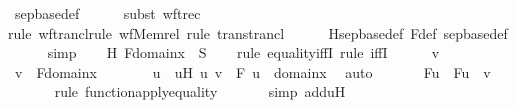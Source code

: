 \begin{isabellebody}
\ sep{\isacharunderscore}{\kern0pt}base{\isacharunderscore}{\kern0pt}def\ \isanewline
\ \ \ \ \isamarkupfalse%
{\isacharparenleft}{\kern0pt}subst\ wftrec{\isacharparenright}{\kern0pt}\isanewline
\ \ \ \ \ \ \isamarkupfalse%
{\isacharparenleft}{\kern0pt}rule\ wf{\isacharunderscore}{\kern0pt}trancl{\isacharcomma}{\kern0pt}rule\ wf{\isacharunderscore}{\kern0pt}Memrel{\isacharcomma}{\kern0pt}\ rule\ trans{\isacharunderscore}{\kern0pt}trancl{\isacharparenright}{\kern0pt}\isanewline
\ \ \ \ \isamarkupfalse%
\ Hsep{\isacharunderscore}{\kern0pt}base{\isacharunderscore}{\kern0pt}def\ F{\isacharunderscore}{\kern0pt}def\ sep{\isacharunderscore}{\kern0pt}base{\isacharunderscore}{\kern0pt}def\isanewline
\ \ \ \ \isamarkupfalse%
\ simp\isanewline
\isanewline
\ \ \isamarkupfalse%
\ H{}{\isacharcolon}{\kern0pt}\ {\isachardoublequoteopen}F{\isacharbackquote}{\kern0pt}{\isacharbackquote}{\kern0pt}domain{\isacharparenleft}{\kern0pt}x{\isacharparenright}{\kern0pt}\ {\isacharequal}{\kern0pt}\ S{\isachardoublequoteclose}\ \isanewline
\ \ \isamarkupfalse%
{\isacharparenleft}{\kern0pt}rule\ equality{\isacharunderscore}{\kern0pt}iffI{\isacharcomma}{\kern0pt}\ rule\ iffI{\isacharparenright}{\kern0pt}\isanewline
\ \ \ \ \isamarkupfalse%
\ v\ \isamarkupfalse%
\ {\isachardoublequoteopen}v\ {\isasymin}\ F{\isacharbackquote}{\kern0pt}{\isacharbackquote}{\kern0pt}domain{\isacharparenleft}{\kern0pt}x{\isacharparenright}{\kern0pt}{\isachardoublequoteclose}\isanewline
\ \ \ \ \isamarkupfalse%
\ \isamarkupfalse%
\ u\ \ uH{\isacharcolon}{\kern0pt}\ {\isachardoublequoteopen}{\isacharless}{\kern0pt}u{\isacharcomma}{\kern0pt}\ v{\isachargreater}{\kern0pt}\ {\isasymin}\ F{\isachardoublequoteclose}\ {\isachardoublequoteopen}u\ {\isasymin}\ domain{\isacharparenleft}{\kern0pt}x{\isacharparenright}{\kern0pt}{\isachardoublequoteclose}\ \isamarkupfalse%
\ auto\ \isanewline
\ \ \ \ \isamarkupfalse%
\ Fu\ {\isacharcolon}{\kern0pt}\ {\isachardoublequoteopen}F{\isacharbackquote}{\kern0pt}u\ {\isacharequal}{\kern0pt}\ v{\isachardoublequoteclose}\ \isanewline
\ \ \ \ \ \ \isamarkupfalse%
{\isacharparenleft}{\kern0pt}rule\ function{\isacharunderscore}{\kern0pt}apply{\isacharunderscore}{\kern0pt}equality{\isacharparenright}{\kern0pt}\isanewline
\ \ \ \ \ \ \isamarkupfalse%
{\isacharparenleft}{\kern0pt}simp\ add{\isacharcolon}{\kern0pt}uH{\isacharparenright}{\kern0pt}\isanewline

\end{isabellebody}

